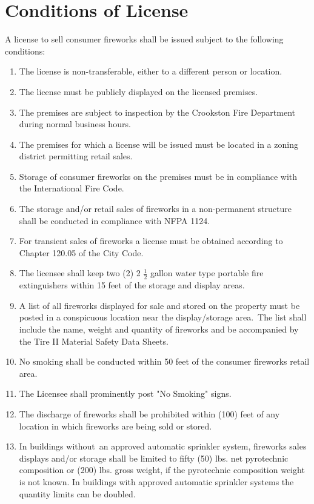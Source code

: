 \section{Conditions of License}
A license to sell consumer fireworks shall be issued subject to the following conditions:
\begin{enumerate}[{\indent}A)]
    \item The license is non-transferable, either to a different person or location.
    \item The license must be publicly displayed on the licensed premises.
    \item The premises are subject to inspection by the Crookston Fire Department during normal business hours.
    \item The premises for which a license will be issued must be located in a zoning district permitting retail sales.
    \item Storage of consumer fireworks on the premises must be in compliance with the International Fire Code.
    \item The storage and/or retail sales of fireworks in a non-permanent structure shall be conducted in compliance with NFPA 1124.
    \item For transient sales of fireworks a license must be obtained according to Chapter 120.05 of the City Code.
    \item The licensee shall keep two (2) 2 $\frac{1}{2}$ gallon water type portable fire extinguishers within 15 feet of the storage and display areas.
    \item A list of all fireworks displayed for sale and stored on the property must be posted in a conspicuous location near the display/storage area. The list shall include the name, weight and quantity of fireworks and be accompanied by the Tire II Material Safety Data Sheets.
    \item No smoking shall be conducted within 50 feet of the consumer fireworks retail area.
    \item The Licensee shall prominently post "No Smoking" signs.
    \item The discharge of fireworks shall be prohibited within (100) feet of any location in which fireworks are being sold or stored.
    \item In buildings without an approved automatic sprinkler system, fireworks sales displays and/or storage shall be limited to fifty (50) lbs. net pyrotechnic composition or (200) lbs. gross weight, if the pyrotechnic composition weight is not known. In buildings with approved automatic sprinkler systems the quantity limits can be doubled.
\end{enumerate}

